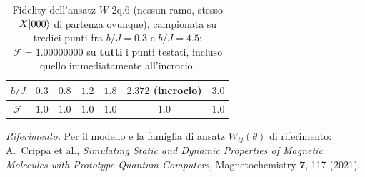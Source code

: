 \documentclass[11pt,a4paper]{article}
\begin{document}
\begin{table}[htbp]
\centering
\small
\renewcommand{\arraystretch}{1.2}
\begin{tabular}{@{}ccccccc@{}}
\toprule
\rowcolor{grigetto}
$b/J$ & $0.3$ & $0.8$ & $1.2$ & $1.8$ & $2.372$ (incrocio) & $3.0$ \\
\midrule
$\mathcal F$ & $1.0$ & $1.0$ & $1.0$ & $1.0$ & $1.0$ & $1.0$ \\
\bottomrule
\end{tabular}
\caption{Fidelity dell'ansatz $W$-2q.6 (nessun ramo, stesso $X\lvert 000\rangle$
di partenza ovunque), campionata su tredici punti fra $b/J=0.3$ e
$b/J=4.5$: $\mathcal F=1.00000000$ su \textbf{tutti} i punti testati,
incluso quello immediatamente all'incrocio.}
\end{table}
\FloatBarrier

\bigskip
\noindent\footnotesize\textit{Riferimento.} Per il modello e la famiglia di
ansatz $W_{ij}(\theta)$ di riferimento: A.~Crippa et al., \emph{Simulating
Static and Dynamic Properties of Magnetic Molecules with Prototype Quantum
Computers}, Magnetochemistry \textbf{7}, 117 (2021).
\end{document}

